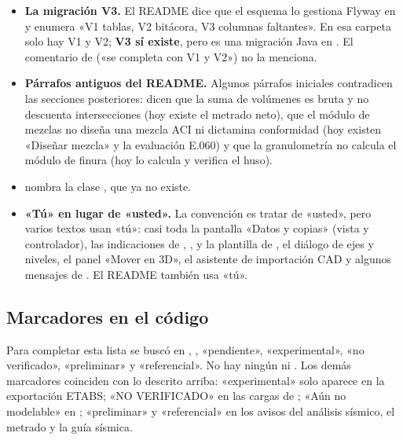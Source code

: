 \begin{itemize}
	\item \textbf{La migración V3.} El README dice que el esquema lo gestiona Flyway en
	       y enumera «V1 tablas, V2 bitácora, V3 columnas faltantes». En esa carpeta
	      solo hay V1 y V2; \textbf{V3 sí existe}, pero es una migración Java en
	      . El comentario de 
	      («se completa con V1 y V2») no la menciona.
	\item \textbf{Párrafos antiguos del README.} Algunos párrafos iniciales contradicen las secciones posteriores: dicen
	      que la suma de volúmenes es bruta y no descuenta intersecciones (hoy existe el metrado neto), que el módulo de
	      mezclas no diseña una mezcla ACI ni dictamina conformidad (hoy existen «Diseñar mezcla» y la evaluación E.060)
	      y que la granulometría no calcula el módulo de finura (hoy lo calcula y verifica el huso).
	\item {} nombra la clase , que ya no existe.
	\item \textbf{«Tú» en lugar de «usted».} La convención es tratar de «usted», pero varios textos usan «tú»: casi toda
	      la pantalla «Datos y copias» (vista y controlador), las indicaciones de ,
	      ,  y la plantilla de , el diálogo de ejes y
	      niveles, el panel «Mover en 3D», el asistente de importación CAD y algunos mensajes de .
	      El README también usa «tú».
\end{itemize}

\subsection{Marcadores en el código}

Para completar esta lista se buscó en  , , «pendiente», «experimental», «no
verificado», «preliminar» y «referencial». No hay ningún  ni . Los demás marcadores coinciden con
lo descrito arriba: «experimental» solo aparece en la exportación ETABS; «NO VERIFICADO» en las cargas de
; «Aún no modelable» en ; «preliminar» y «referencial» en los avisos del
análisis sísmico, el metrado y la guía sísmica.
